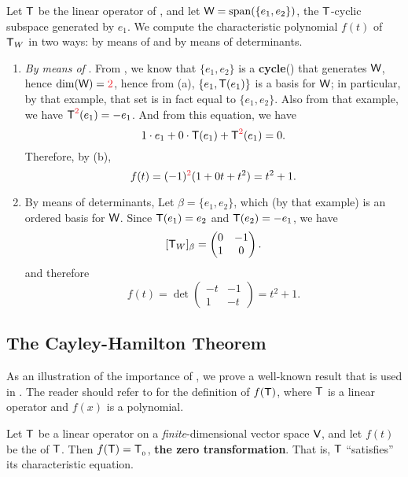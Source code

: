 \begin{example} \label{example 5.4.6}
Let \(\textsf{T}\) be the linear operator of , and let \(\textsf{W} = \operatorname{span}(\{ e_1, e_2 \})\), the \(\textsf{T}\)-cyclic subspace generated by \(e_1\).
We compute the characteristic polynomial \(f(t)\) of \(\textsf{T}_W\) in two ways: by means of  and by means of determinants.
\begin{enumerate}
\item \emph{By means of }.
From , we know that \(\{ e_1, e_2\}\) is a \textbf{cycle}() that generates \(\textsf{W}\), hence \(\dim(\W) = \RED{2}\), hence from (a), \(\{ e_1, \textsf{T}(e_1) \}\) is a basis for \(\textsf{W}\);
in particular, by that example, that set is in fact equal to \(\{ e_1, e_2 \}\).
Also from that example, we have \(\T^{\RED{2}}(e_1) = -e_1\).
And from this equation, we have
\[
    1 \cdot e_1 + 0 \cdot \T(e_1) + \T^{\RED{2}}(e_1) = 0.
\]
Therefore, by (b),
\[
    f(t) = (-1)^{\RED{2}} (1 + 0t + t^2) = t^2 + 1.
\]

\item By means of determinants, Let \(\beta = \{ e_1, e_2 \}\), which (by that example) is an ordered basis for \(\textsf{W}\).
Since \(\textsf{T}(e_1) = e_2\) and \(\textsf{T}(e_2) = -e_1\), we have
\[
    [\textsf{T}_W]_{\beta} = \begin{pmatrix} 0 & -1 \\ 1 & 0 \end{pmatrix}.
\]
and therefore
\[
    f(t) = \det \begin{pmatrix} -t & -1 \\ 1 & -t \end{pmatrix} = t^2 + 1.
\]
\end{enumerate}
\end{example}

\subsection{The Cayley-Hamilton Theorem} \label{sec 5.4.1}
As an illustration of the importance of , we prove a well-known result that is used in .
The reader should refer to  for the definition of \(f(\textsf{T})\), where \(\textsf{T}\) is a linear operator and \(f(x)\) is a polynomial.

\begin{theorem}  \label{thm 5.22}
Let \(\textsf{T}\) be a linear operator on a \emph{finite}-dimensional vector space \(\textsf{V}\), and let \(f(t)\) be the \CPOLY{} of \(\textsf{T}\).
Then \(f(\textsf{T}) = \textsf{T}_{_0}\), \textbf{the zero transformation}.
That is, \(\textsf{T}\) ``satisfies'' its characteristic equation.
\end{theorem}

